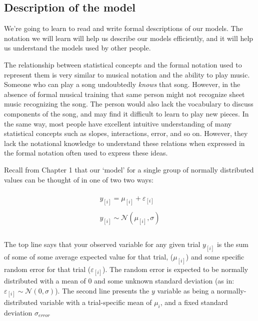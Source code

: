 \documentclass[
]{book}
\begin{document}
\hypertarget{description-of-the-model}{%
\subsection{Description of the model}\label{description-of-the-model}}

We're going to learn to read and write formal descriptions of our models. The notation we will learn will help us describe our models efficiently, and it will help us understand the models used by other people.

The relationship between statistical concepts and the formal notation used to represent them is very similar to musical notation and the ability to play music. Someone who can play a song undoubtedly \emph{knows} that song. However, in the absence of formal musical training that same person might not recognize sheet music recognizing the song. The person would also lack the vocabulary to discuss components of the song, and may find it difficult to learn to play new pieces. In the same way, most people have excellent intuitive understanding of many statistical concepts such as slopes, interactions, error, and so on. However, they lack the notational knowledge to understand these relations when expressed in the formal notation often used to express these ideas.

Recall from Chapter 1 that our `model' for a single group of normally distributed values can be thought of in one of two two ways:

\begin{equation}
\begin{split}
\\
y_{[i]} = \mu_{[i]} + \varepsilon_{[i]} \\ \\
y_{[i]} \sim \mathcal{N}(\mu_{[i]},\sigma) \\ \\
\end{split}
\label{eq:21}
\end{equation}

The top line says that your observed variable for any given trial \(y_{[i]}\) is the sum of some of some average expected value for that trial, (\(\mu_{[i]}\)) and some specific random error for that trial (\(\varepsilon_{[i]}\)). The random error is expected to be normally distributed with a mean of 0 and some unknown standard deviation (as in: \(\varepsilon_{[i]} \sim \mathcal{N}(0,\sigma)\)). The second line presents the \(y\) variable as being a normally-distributed variable with a trial-specific mean of \(\mu_i\), and a fixed standard deviation \(\sigma_{error}\)
\end{document}
